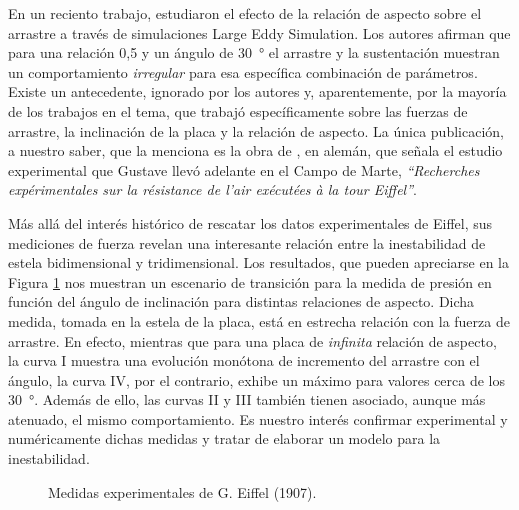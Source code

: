 \documentclass[spanish]{article}
\begin{document}
	En un reciento trabajo, \citet{shademan2020effects} estudiaron el efecto de la relación de aspecto sobre el arrastre a través de simulaciones Large Eddy Simulation. Los autores afirman que para una relación 0,5 y un ángulo de \SI{30}{\degree} el arrastre y la sustentación muestran  un comportamiento \textit{irregular} para esa específica combinación de parámetros. Existe un antecedente, ignorado por los autores y, aparentemente, por la mayoría de los trabajos en el tema, que trabajó específicamente sobre las fuerzas de arrastre, la inclinación de la placa y la relación de aspecto. La única publicación, a nuestro saber, que la menciona es la obra de \citet{flachsbart1932}, en alemán, que señala el  estudio experimental que Gustave \citet{eiffel1907recherches} llevó adelante en el Campo de Marte,   \textit{``Recherches exp{\'e}rimentales sur la r{\'e}sistance de l'air ex{\'e}cut{\'e}es {\`a} la tour Eiffel''}.	
	
	Más allá del interés histórico de rescatar los datos experimentales de Eiffel, sus mediciones de fuerza revelan una interesante relación entre la inestabilidad de estela bidimensional y tridimensional. Los resultados, que pueden apreciarse en la Figura \ref{fig:eiffel} nos muestran un escenario de transición para la medida de presión en función del ángulo de inclinación para distintas relaciones de aspecto. Dicha medida, tomada en la estela de la placa, está en estrecha relación con la fuerza de arrastre. En efecto, mientras que para una placa de \textit{infinita } relación de aspecto, la curva I muestra una evolución monótona de incremento del arrastre con el ángulo, la curva IV, por el contrario, exhibe un máximo para valores cerca de los \SI{30}{\degree}. Además de ello, las curvas II y III también tienen asociado, aunque más atenuado, el mismo comportamiento. Es nuestro interés confirmar experimental y numéricamente dichas medidas y tratar de elaborar un modelo para la inestabilidad.
	
	\begin{figure}\centering
		\caption{Medidas experimentales de G. Eiffel (1907).}\label{fig:eiffel}
	\end{figure}
\end{document}
